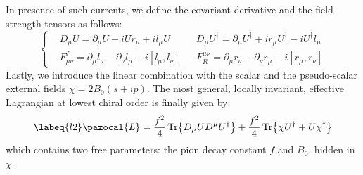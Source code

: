 \documentclass[../main.tex]{subfiles}
\begin{document}
In presence of such currents, we define the covariant derivative and the field strength tensors as follows:
\[
\left\{
\begin{aligned}
&D_\mu U=\partial_\mu U-iUr_\mu+il_\mu U &&D_\mu U^\dagger=\partial_\mu U^\dagger+ir_\mu U^\dagger-iU^\dagger l_\mu\\
&F_{\mu\nu}^L=\partial_\mu l_\nu-\partial_\nu l_\mu-i[l_\mu,l_\nu] &&F^{\mu\nu}_R=\partial_\mu r_\nu-\partial_\nu r_\mu-i[r_\mu,r_\nu]
\end{aligned}
\right.
\]
Lastly, we introduce the linear combination with the scalar and the pseudo-scalar external fields $\chi=2B_0(s+ip)$. The most
general, locally invariant, effective Lagrangian at lowest chiral order is finally given by:
\begin{equation}
\labeq{l2}    
\pazocal{L}=\frac{f^2}{4}\Tr{D_\mu UD^\mu U^\dagger}+\frac{f^2}{4}\Tr{\chi U^\dagger+U\chi^\dagger} 
\end{equation}
which contains two free parameters: the pion decay constant $f$ and $B_0$, hidden in $\chi$.
\end{document}
